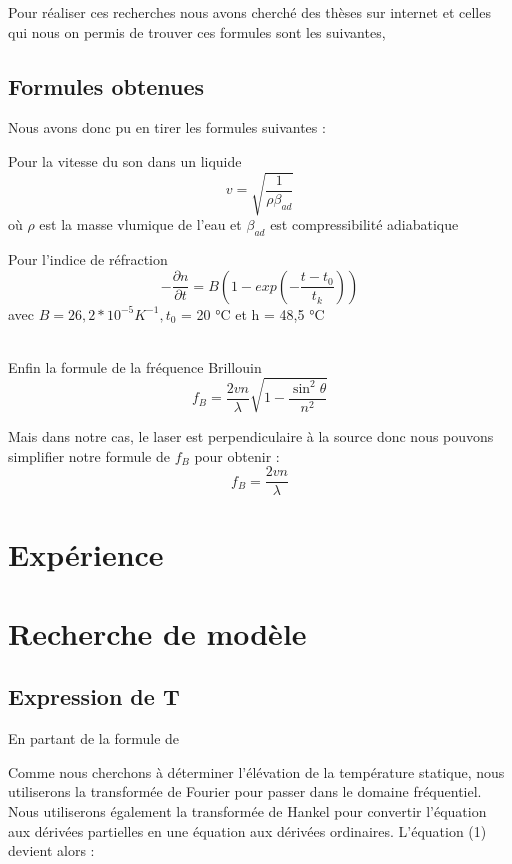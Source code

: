 \documentclass{rapportECC}
\begin{document}
Pour réaliser ces recherches nous avons cherché des thèses sur internet et celles qui nous on permis de trouver ces formules sont les suivantes,


\subsection{Formules obtenues}

Nous avons donc pu en tirer les formules suivantes :

Pour la vitesse du son dans un liquide
\begin{equation}
    v = \sqrt{\frac{1}{\rho \beta_{ad}}}
\end{equation}
où $\rho$ est la masse vlumique de l'eau et $\beta_{ad}$ est compressibilité adiabatique

Pour l'indice de réfraction 
\begin{equation}
    -\frac{\partial n}{\partial t} = B(1-exp(-\frac{t-t_0}{t_k}))
\end{equation}
avec $B=26,2*10^{-5} K^{-1}, t_0$ = 20 °C et h = 48,5 °C

\\
Enfin la formule de la fréquence Brillouin
\begin{equation}
    f_B = \frac{2vn}{\lambda}\sqrt{1-\frac{\sin^2{\theta}}{n^2}}
\end{equation}

Mais dans notre cas, le laser est perpendiculaire à la source donc nous pouvons simplifier notre formule de $f_B$ pour obtenir :
\begin{equation}
    f_B =  \frac{2vn}{\lambda}
\end{equation}

\section{Expérience}



\section{Recherche de modèle}

\subsection{Expression de T}

En partant de la formule de 

Comme nous cherchons à déterminer l’élévation de la température statique,
nous utiliserons la transformée de Fourier pour passer dans le domaine
fréquentiel. Nous utiliserons également la transformée de Hankel pour convertir
l’équation aux dérivées partielles en une équation aux dérivées ordinaires.
L’équation (1) devient alors :
\end{document}
